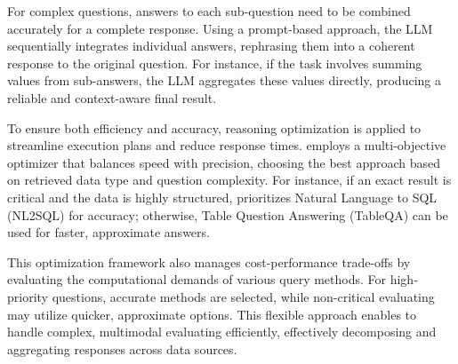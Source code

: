 For complex questions, answers to each sub-question need to be combined accurately for a complete response. Using a prompt-based approach, the LLM sequentially integrates individual answers, rephrasing them into a coherent response to the original question. For instance, if the task involves summing values from sub-answers, the LLM aggregates these values directly, producing a reliable and context-aware final result.


To ensure both efficiency and accuracy, reasoning optimization is applied to streamline execution plans and reduce response times. \sys employs a multi-objective optimizer that balances speed with precision, choosing the best approach based on retrieved data type and question complexity. For instance, if an exact result is critical and the data is highly structured, \sys prioritizes Natural Language to SQL (NL2SQL) for accuracy; otherwise, Table Question Answering (TableQA) can be used for faster, approximate answers.



This optimization framework also manages cost-performance trade-offs by evaluating the computational demands of various query methods. For high-priority questions, accurate methods are selected, while non-critical evaluating may utilize quicker, approximate options. This flexible approach enables \sys to handle complex, multimodal evaluating efficiently, effectively decomposing and aggregating responses across data sources.




